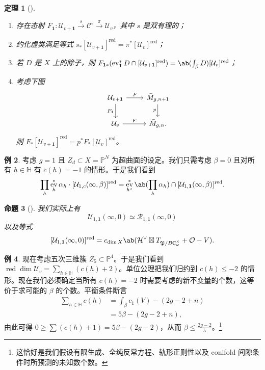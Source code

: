 \documentclass{amsart}
\newtheorem{thm}{定理}[section]
\newtheorem{prop}[thm]{命题}
\theoremstyle{definition}
\newtheorem{exm}[thm]{例}
\theoremstyle{remark}
\theoremstyle{plain}
\theoremstyle{definition}
\theoremstyle{remark}
\newcommand{\C}{\mathbb{C}}
\renewcommand{\H}{\mathbb{H}}
\renewcommand{\P}{\mathbb{P}}
\newcommand{\mc}[1]{\mathcal{#1}}
\newcommand{\mf}[1]{\mathfrak{#1}}
\newcommand{\mr}[1]{\mathrm{#1}}
\newcommand{\on}[1]{\operatorname{#1}}
\newcommand{\1}{\mathbf{1}}
\newcommand{\2}{\mathbf{2}}
\newcommand{\3}{\mathbf{3}}
\DeclareMathOperator{\ev}{ev}
\begin{document}
\begin{thm}[{\cite[Theorems~1.16--1.17]{CJRpunctured}}]\leavevmode
    \begin{enumerate}
        \item 存在态射 \(F_{\1} \colon \mc{U}_{v+\1} \xrightarrow{s} \mc{C}^{\circ} \xrightarrow{\pi} \mc{U}_v\)，其中 \(s\) 是双有理的；
        \item 约化虚类满足等式 \(s_* [\mc{U}_{v+\1}]^{\on{red}} = \pi^* [\mc{U}_v]^{\on{red}}\)；
        \item 若 \(D\) 是 \(X\) 上的除子，则 \(F_{\1 *} (\ev_{\1}^* D \cap [\mc{U}_{v+\1}]^{\on{red}}) = \ab(\int_{\beta} D) [\mc{U}_v]^{\on{red}}\)；
        \item 考虑下图
            \begin{equation*}
            \begin{tikzcd}
                \mc{U}_{v+\1} \ar{r}{F} \ar{d}[swap]{F_{\1}} & \bar{M}_{g,n+1} \ar{d}[swap]{p} \\
                \mc{U}_v \ar{r}{F} & \bar{M}_{g,n}.
            \end{tikzcd}
            \end{equation*}
            则 \(F_* [\mc{U}_{v+\1}]^{\on{red}} = p^* F_* [\mc{U}_v]^{\on{red}}\)。
    \end{enumerate}
\end{thm}

\begin{exm}
    考虑 \(g = 1\) 且 \(Z_d \subset X = \P^N\) 为超曲面的设定。我们只需考虑 \(\beta = 0\) 且对所有 \(h \in \H\) 有 \(c(h) = -1\) 的情形。于是我们看到
    \[ \prod_h \ev_h^* \alpha_h \cdot [\mc{U}_{1,c}(\infty,\beta)]^{\mr{red}} = \ev_{h^{\star}}^* \ab(\prod_h \alpha_h) \cap [\mc{U}_{1,\1}(\infty,\beta)]^{\on{red}}. \]
\end{exm}

\begin{prop}[{\cite{CJRpunctured}}]
    我们实际上有
    \[ \mc{U}_{1,\1}(\infty, 0) \simeq \mc{R}_{1,\1}(\infty, 0) \]
    以及等式
    \[ [\mc{U}_{1,\1}(\infty, 0)]^{\on{red}} = c_{\dim X} \ab(\mc{H}^{\vee} \boxtimes T_{\mf{P}/B\C_{\omega}^{\times}} + \mc{O} - V). \]
\end{prop}

\begin{exm}
    现在考虑五次三维簇 \(Z_5 \subset \P^4\)。于是我们看到 \(\on{red}\dim \mc{U}_v = \sum_{h \in \H} (c(h)+2)\)。单位公理把我们归约到 \(c(h) \leq -2\) 的情形。现在我们必须确定当所有 \(c(h) = -2\) 时需要考虑的新不变量的个数，这等价于求可能的 \(\beta\) 的个数。平衡条件断言
    \begin{align*}
        \sum_{h \in \H} c(h) &= \int_{\beta} c_1(V) - (2g-2+n) \\
        &= 5\beta - (2g-2+n),
    \end{align*}
    由此可得 \(0 \geq \sum (c(h)+1) = 5\beta - (2g-2)\)，从而 \(\beta \leq \frac{2g-2}{5}\)。\footnote{这恰好是我们假设有限生成、全纯反常方程、轨形正则性以及 conifold 间隙条件时所预测的未知数个数。}
\end{exm}
\end{document}
